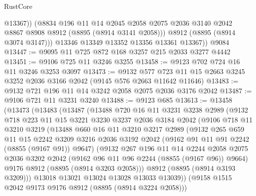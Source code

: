 \begin{lexlean}{RustCore}
\begin{coremodule}
              @13367))
          (@8834
            @196
            @11
            @14
            @2045
            @2058
            @2075
            @2036
            @3140
            @2042
            @8867
            @8908
            @8912
            (@8895 (@8914 @3141 @2058)))
          @8912
          (@8895 (@8914 @3074 @3147)))
        @13346
        @13349
        @13352
        @13356
        @13361
        @13367))
    @9084
@13447 := @9095 @11 @725 @872 @168 @3257 @215 @2033 @3277 @4442
@13451 := @9106 @725 @11 @3246 @3255
@13458 := @9123 @702 @724 @16 @11 @3246 @3253 @3097
@13473 := @9132
    @577
    @723
    @11
    @15
    @2663
    @3245
    @3252
    @2036
    @3166
    @2042
    (@9145 @576 @2663 @11642 @11646)
@13483 := @9132 @721 @196 @11 @14 @3242 @2058 @2075 @2036 @3176 @2042
@13487 := @9106 @721 @11 @3231 @3240
@13488 := @9123 @685
@13613 := @13458
    (@13473
      (@13483
        (@13487
          (@13488
            @720
            @16
            @11
            @3231
            @3238
            @2989
            (@9132
              @718
              @223
              @11
              @15
              @3221
              @3230
              @3237
              @2036
              @3184
              @2042
              (@9106
                @718
                @11
                @3210
                @3219
                (@13488
                  @660
                  @16
                  @11
                  @3210
                  @3217
                  @2989
                  (@9132
                    @265
                    @659
                    @11
                    @15
                    @2242
                    @3209
                    @3216
                    @2036
                    @3192
                    @2042
                    (@9162 @91 @11 @91 @2242 (@8855 (@9167 @91)) @9647)
                    (@9132
                      @267
                      @196
                      @11
                      @14
                      @2244
                      @2058
                      @2075
                      @2036
                      @3202
                      @2042
                      (@9162 @96 @11 @96 @2244 (@8855 (@9167 @96)) @9664)
                      @9176
                      @8912
                      (@8895 (@8914 @3203 @2058)))
                    @8912
                    (@8895 (@8914 @3193 @3209)))
                  @13018
                  @13021
                  @13024
                  @13028
                  @13033
                  @13039))
              (@9158 @1515 @2042 @9173 @9176 @8912 (@8895 (@8914 @3224 @2058)))

\end{coremodule}
\end{lexlean}
